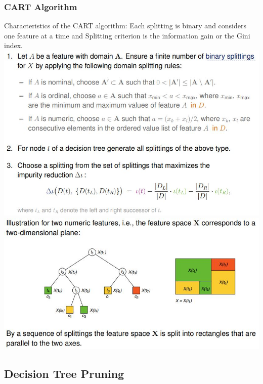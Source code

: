 \documentclass[11pt,a4paper]{article}
\begin{document}
\begin{flushleft}
\subsubsection{CART Algorithm}
Characteristics of the CART algorithm: Each splitting is binary and considers one feature at a time and  Splitting criterion is the information gain or the Gini index. 
\includegraphics[width = \textwidth]{cart}
\includegraphics[width = \textwidth]{cartTree}
\subsection{Decision Tree Pruning}

\end{flushleft}
\end{document}
